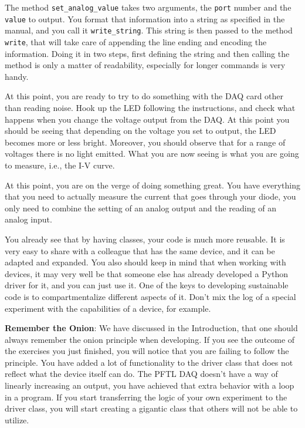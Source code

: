 The method \texttt{set\_analog\_value} takes two arguments, the
\texttt{port} number and the \texttt{value} to output. You format that
information into a string as specified in the manual, and you call it
\texttt{write\_string}. This string is then passed to the method
\texttt{write}, that will take care of appending the line ending and
encoding the information. Doing it in two steps, first defining the
string and then calling the method is only a matter of readability,
especially for longer commands is very handy.

At this point, you are ready to try to do something with the {DAQ} card
other than reading noise. Hook up the {LED} following the instructions,
and check what happens when you change the voltage output from the
{DAQ}. At this point you should be seeing that depending on the voltage
you set to output, the {LED} becomes more or less bright. Moreover, you
should observe that for a range of voltages there is no light emitted.
What you are now seeing is what you are going to measure, i.e., the
I-V curve.

At this point, you are on the verge of doing something great. You have
everything that you need to actually measure the current that goes
through your diode, you only need to combine the setting of an analog
output and the reading of an analog input.




You already see that by having classes, your code is much more reusable.
It is very easy to share with a colleague that has the same device, and
it can be adapted and expanded. You also should keep in mind that when
working with devices, it may very well be that someone else has already
developed a Python driver for it, and you can just use it. One of the
keys to developing sustainable code is to compartmentalize different
aspects of it. Don't mix the log of a special experiment with the
capabilities of a device, for example.

\textbf{Remember the Onion}: We have discussed in the Introduction, that
one should always remember the onion principle when developing. If you
see the outcome of the exercises you just finished, you will notice that
you are failing to follow the principle. You have added a lot of
functionality to the driver class that does not reflect what the device
itself can do. The {PFTL} {DAQ} doesn't have a way of linearly
increasing an output, you have achieved that extra behavior with a loop
in a program. If you start transferring the logic of your own experiment
to the driver class, you will start creating a gigantic class that
others will not be able to utilize.

